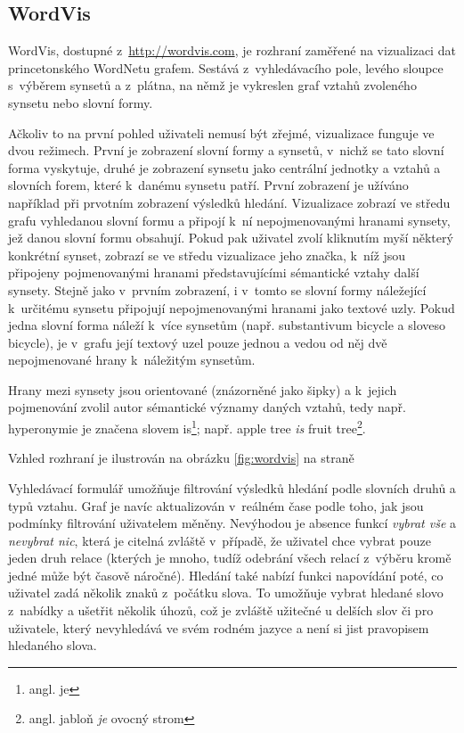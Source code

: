 \documentclass[a4paper, 11pt, oneside, showtrims]{book}
\newcommand\ex{\textsf}
\begin{document}
				\subsection{WordVis}
				\label{vis:wordvis}

					WordVis, dostupné z~\url{http://wordvis.com}, je rozhraní zaměřené na vizualizaci dat princetonského WordNetu grafem. Sestává z~vyhledávacího pole, levého sloupce s~výběrem synsetů a z~plátna, na němž je vykreslen graf vztahů zvoleného synsetu nebo slovní formy. 

					Ačkoliv to na první pohled uživateli nemusí být zřejmé, vizualizace funguje ve dvou režimech. První je zobrazení slovní formy a synsetů, v~nichž se tato slovní forma vyskytuje, druhé je zobrazení synsetu jako centrální jednotky a vztahů a slovních forem, které k~danému synsetu patří. První zobrazení je užíváno například při prvotním zobrazení výsledků hledání. Vizualizace zobrazí ve středu grafu vyhledanou slovní formu a připojí k~ní nepojmenovanými hranami synsety, jež danou slovní formu obsahují. Pokud pak uživatel zvolí kliknutím myší některý konkrétní synset, zobrazí se ve středu vizualizace jeho značka, k~níž jsou připojeny pojmenovanými hranami představujícími sémantické vztahy další synsety. Stejně jako v~prvním zobrazení, i v~tomto se slovní formy náležející k~určitému synsetu připojují nepojmenovanými hranami jako textové uzly. Pokud jedna slovní forma náleží k~více synsetům (např. substantivum \ex{bicycle} a sloveso \ex{bicycle}), je v~grafu její textový uzel pouze jednou a vedou od něj dvě nepojmenované hrany k~náležitým synsetům. 

					Hrany mezi synsety jsou orientované (znázorněné jako šipky) a k~jejich pojmenování zvolil autor sémantické významy daných vztahů, tedy např. hyperonymie je značena slovem \ex{is}\footnote{angl. \ex{je}}; např. \ex{apple tree \textit{is} fruit tree}\footnote{angl. \ex{jabloň \textit{je} ovocný strom}}.

					Vzhled rozhraní je ilustrován na obrázku \ref{fig:wordvis} na straně \pageref{fig:wordvis}

					Vyhledávací formulář umožňuje filtrování výsledků hledání podle slovních druhů a typů vztahu. Graf je navíc aktualizován v~reálném čase podle toho, jak jsou podmínky filtrování uživatelem měněny. Nevýhodou je absence funkcí \textit{vybrat vše} a \textit{nevybrat nic}, která je citelná zvláště v~případě, že uživatel chce vybrat pouze jeden druh relace (kterých je mnoho, tudíž odebrání všech relací z~výběru kromě jedné může být časově náročné). Hledání také nabízí funkci napovídání poté, co uživatel zadá několik znaků z~počátku slova. To umožňuje vybrat hledané slovo z~nabídky a ušetřit několik úhozů, což je zvláště užitečné u delších slov či pro uživatele, který nevyhledává ve svém rodném jazyce a není si jist pravopisem hledaného slova.
\end{document}
